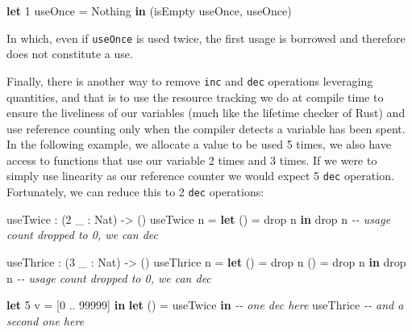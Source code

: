 \documentclass[
]{article}
\newenvironment{Shaded}{}{}
\newcommand{\CommentTok}[1]{\textcolor[rgb]{0.38,0.63,0.69}{\textit{#1}}}
\newcommand{\DataTypeTok}[1]{\textcolor[rgb]{0.56,0.13,0.00}{#1}}
\newcommand{\DecValTok}[1]{\textcolor[rgb]{0.25,0.63,0.44}{#1}}
\newcommand{\FunctionTok}[1]{\textcolor[rgb]{0.02,0.16,0.49}{#1}}
\newcommand{\KeywordTok}[1]{\textcolor[rgb]{0.00,0.44,0.13}{\textbf{#1}}}
\newcommand{\NormalTok}[1]{#1}
\newcommand{\OperatorTok}[1]{\textcolor[rgb]{0.40,0.40,0.40}{#1}}
\newcommand{\OtherTok}[1]{\textcolor[rgb]{0.00,0.44,0.13}{#1}}
\begin{document}
\begin{Shaded}
\begin{Highlighting}[]
\KeywordTok{let} \DecValTok{1}\NormalTok{ useOnce }\OtherTok{=} \DataTypeTok{Nothing} \KeywordTok{in}
\NormalTok{    (isEmpty useOnce, useOnce)}
\end{Highlighting}
\end{Shaded}

In which, even if \texttt{useOnce} is used twice, the first usage is
borrowed and therefore does not constitute a use.

Finally, there is another way to remove \texttt{inc} and \texttt{dec}
operations leveraging quantities, and that is to use the resource
tracking we do at compile time to ensure the liveliness of our variables
(much like the lifetime checker of Rust) and use reference counting only
when the compiler detects a variable has been spent. In the following
example, we allocate a value to be used 5 times, we also have access to
functions that use our variable 2 times and 3 times. If we were to
simply use linearity as our reference counter we would expect 5
\texttt{dec} operation. Fortunately, we can reduce this to 2
\texttt{dec} operations:

\begin{Shaded}
\begin{Highlighting}[]
\NormalTok{useTwice }\OperatorTok{:}\NormalTok{ (}\DecValTok{2}\NormalTok{ \_ }\OperatorTok{:} \DataTypeTok{Nat}\NormalTok{) }\OtherTok{{-}\textgreater{}}\NormalTok{ ()}
\NormalTok{useTwice n }\OtherTok{=} \KeywordTok{let}\NormalTok{ () }\OtherTok{=} \FunctionTok{drop}\NormalTok{ n }\KeywordTok{in}
                 \FunctionTok{drop}\NormalTok{ n }\CommentTok{{-}{-} usage count dropped to 0, we can \textasciigrave{}dec\textasciigrave{}}

\NormalTok{useThrice }\OperatorTok{:}\NormalTok{ (}\DecValTok{3}\NormalTok{ \_ }\OperatorTok{:} \DataTypeTok{Nat}\NormalTok{) }\OtherTok{{-}\textgreater{}}\NormalTok{ ()}
\NormalTok{useThrice n }\OtherTok{=} \KeywordTok{let}\NormalTok{ () }\OtherTok{=} \FunctionTok{drop}\NormalTok{ n }
\NormalTok{                  () }\OtherTok{=} \FunctionTok{drop}\NormalTok{ n}
               \KeywordTok{in} \FunctionTok{drop}\NormalTok{ n }\CommentTok{{-}{-} usage count dropped to 0, we can \textasciigrave{}dec\textasciigrave{}}

\KeywordTok{let} \DecValTok{5}\NormalTok{ v }\OtherTok{=}\NormalTok{ [}\DecValTok{0} \OperatorTok{..} \DecValTok{99999}\NormalTok{] }\KeywordTok{in}
\KeywordTok{let}\NormalTok{ () }\OtherTok{=}\NormalTok{ useTwice }\KeywordTok{in} \CommentTok{{-}{-} one \textasciigrave{}dec\textasciigrave{} here}
\NormalTok{    useThrice }\CommentTok{{-}{-} and a second one here}
\end{Highlighting}
\end{Shaded}
\end{document}
